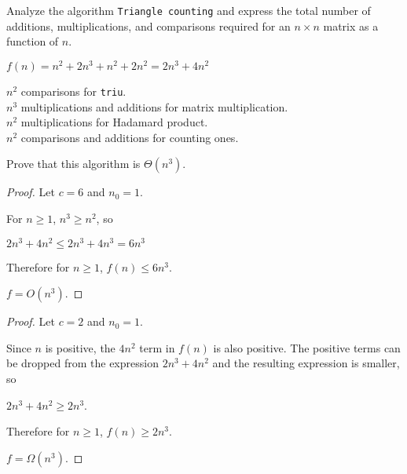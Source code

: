 \documentclass[]{exam}
\begin{document}
\begin{questions}
{      \medskip
    }

    \question Analyze the algorithm \texttt{Triangle counting} and express the
      total number of additions, multiplications, and comparisons required for
      an $n \times n$ matrix as a function of $n$.
      \begin{solution}
        $f(n) = n^2 + 2n^3 + n^2 + 2n^2 = 2n^3+4n^2$

        $n^2$ comparisons for \texttt{triu}.\\
        $n^3$ multiplications and additions for matrix multiplication.\\
        $n^2$ multiplications for Hadamard product.\\
        $n^2$ comparisons and additions for counting ones.
      \end{solution}

    \question Prove that this algorithm is $\Theta(n^3)$.
      \begin{solution}
        \begin{proof}
           Let $c = 6$ and $n_0 = 1$.

           For $n \geq 1$, $n^3 \geq n^2$, so

           $2n^3 + 4n^2 \leq 2n^3 + 4n^3 = 6n^3$

           Therefore for $n \geq 1$, $f(n) \leq 6n^3$.

           $f = O(n^3)$.
        \end{proof}

        \begin{proof}
           Let $c = 2$ and $n_0 = 1$.

           Since $n$ is positive, the $4n^2$ term in $f(n)$ is also positive.
           The positive terms can be dropped from the expression $2n^3 + 4n^2$
           and the resulting expression is smaller, so

           $2n^3 + 4n^2 \geq 2n^3$.

           Therefore for $n \geq 1$, $f(n) \geq 2n^3$.

           $f = \Omega(n^3)$.
        \end{proof}
      \end{solution}
  \end{questions}
\end{document}
